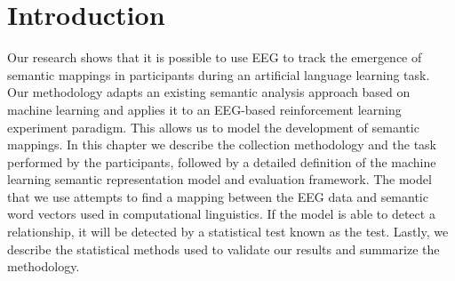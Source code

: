 \section{Introduction}

Our research shows that it is possible to use EEG to track the emergence of 
semantic mappings in participants during an artificial language learning task.  
Our methodology adapts an existing semantic analysis approach based on machine 
learning and applies it to an EEG-based reinforcement learning experiment 
paradigm. This allows us to model the development of semantic mappings. In this 
chapter we describe the collection methodology and the task performed by the 
participants, followed by a detailed definition of the machine learning 
semantic representation model and evaluation framework. The model that we use 
attempts to find a mapping between the EEG data and semantic word vectors used 
in computational linguistics. If the model is able to detect a relationship, it 
will be detected by a statistical test known as the \tvt test. Lastly, we 
describe the statistical methods used to validate our results and summarize the 
methodology.
